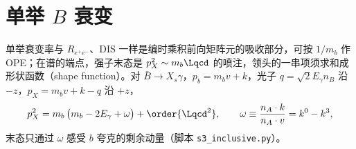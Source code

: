 \section{单举 $B$ 衰变}\label{sec:heavy-inclusive}

单举衰变率与 $R_{e^+e^-}$、DIS 一样是编时乘积前向矩阵元的吸收部分，可按 $1/m_b$ 作 OPE；在谱的端点，强子末态是 $p_X^2\sim m_b\Lqcd$ 的喷注，领头的一串项须求和成形状函数（shape function）。对 $\bar B\to X_s\gamma$，$p_b=m_bv+k$，光子 $q=\sqrt2E_\gamma n_B$ 沿 $-z$，$p_X=m_bv+k-q$ 沿 $+z$，
\begin{equation}\label{eq:heavy-pX2}
p_X^2=m_b\,\big(m_b-2E_\gamma+\omega\big)+\order{\Lqcd^2},\qquad \omega\equiv\frac{n_A\cdot k}{n_A\cdot v}=k^0-k^3 ,
\end{equation}
末态只通过 $\omega$ 感受 $b$ 夸克的剩余动量（脚本 \texttt{s3\_\allowbreak inclusive.py}）。

